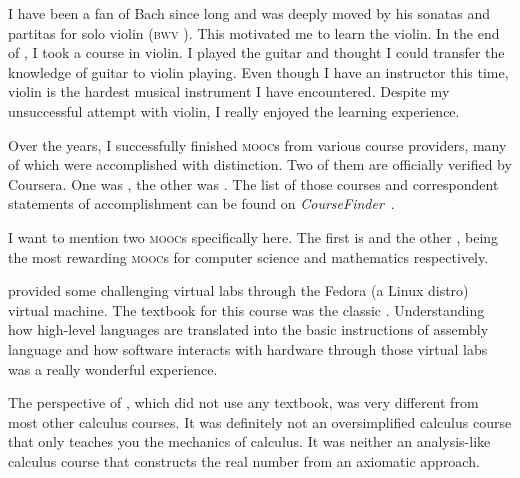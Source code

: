 	I have been a fan of Bach since long and was deeply moved by his sonatas and
	partitas for solo violin (\textsc{bwv} ). This motivated me to
	learn the violin. In the end of , I took a course in violin. I
	played the guitar and thought I could transfer the knowledge of guitar to
	violin playing. Even though I have an instructor this time, violin is the
	hardest musical instrument I have encountered. Despite my unsuccessful attempt
	with violin, I really enjoyed the learning experience.
	
	Over the years, I successfully finished  \textsc{mooc}s from various
	course providers, many of which were accomplished with distinction. Two of them
	are officially verified by Coursera. One was , the other
	was . The list of those  courses and correspondent
	statements of accomplishment can be found on
	\textit{CourseFinder}~\cite{accredible}.
	
	I want to mention two \textsc{mooc}s specifically here. The first is
	 and the other , being the most rewarding
	\textsc{mooc}s for computer science and mathematics respectively.
	
	 provided some challenging virtual labs through the Fedora (a
	Linux distro) virtual machine. The textbook for this course was the classic
	. Understanding how high-level languages are translated
	into the basic instructions of assembly language and how software interacts
	with hardware through those virtual labs was a really wonderful experience.

	The perspective of , which did not use any textbook, was very
	different from most other calculus courses. It was definitely not an
	oversimplified calculus course that only teaches you the mechanics of calculus.
	It was neither an analysis-like calculus course that constructs the real number
	from an axiomatic approach.
	
